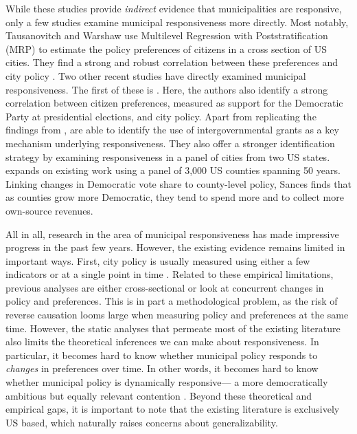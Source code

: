 \documentclass[a4paper,12pt]{article}
\begin{document}
While these studies provide \textit{indirect} evidence that municipalities are responsive, only a few studies examine municipal responsiveness more directly. Most notably, Tausanovitch and Warshaw use Multilevel Regression with Poststratification (MRP) to estimate the policy preferences of citizens in a cross section of US cities. They find a strong and robust correlation between these preferences and city policy \citep[for earlier efforts, see ][]{hajnal2010or,palus2010responsiveness}. Two other recent studies have directly examined municipal responsiveness. The first of these is \cite{einstein2016pushing}. Here, the authors also identify a strong correlation between citizen preferences, measured as support for the Democratic Party at presidential elections,  and city policy. Apart from replicating the findings from \citeauthor{tausanovitch2014representation}, \citeauthor{einstein2016pushing} are able to identify the use of intergovernmental grants as a key mechanism underlying responsiveness. They also offer a stronger identification strategy by examining responsiveness in a panel of cities from two US states.  \citet{sances2017voters} expands on existing work using a panel of 3,000 US counties spanning 50 years. Linking changes in Democratic vote share to county-level policy, Sances finds that as counties grow more Democratic, they tend to spend more and to collect more own-source revenues.



All in all, research in the area of municipal responsiveness has made impressive progress in the past few years. However, the existing evidence remains limited in important ways. First, city policy is usually measured using either a few indicators \citep{sances2017voters,einstein2016pushing} or at a single point in time \citep{tausanovitch2014representation}. Related to these empirical limitations, previous analyses are either cross-sectional or look at concurrent changes in policy and preferences. This is in part a methodological problem, as the risk of reverse causation looms large when measuring policy and preferences at the same time. However, the static analyses that permeate most of the existing literature also limits the theoretical inferences we can make about responsiveness. In particular, it becomes hard to know whether municipal policy responds to \textit{changes} in preferences over time. In other words, it becomes hard to know whether municipal policy is dynamically responsive--- a more democratically ambitious but equally relevant contention \citep[cf.][]{stimson1995dynamic}. Beyond these theoretical and empirical gaps, it is important to note that the existing literature is exclusively US based, which naturally raises concerns about generalizability.
\end{document}
